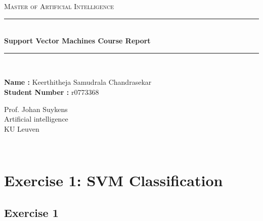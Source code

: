 \documentclass[12pt]{report}
\newcommand{\HRule}{\rule{\linewidth}{0.5mm}}
\begin{document}
	\begin{center}
		\textsc{\LARGE Master of Artificial Intelligence}\\[1.0cm]
		
		\HRule \\[0.4cm]
		{ \huge \bfseries Support Vector Machines Course Report}\\[0.15cm] 
		\HRule \\[1.5cm]
	\end{center}
	
	\begin{minipage}{0.5\textwidth}
		\begin{flushleft} \large
			{\bf Name :} Keerthitheja Samudrala Chandrasekar\\
			{\bf Student Number :} r0773368
		\end{flushleft}
	\end{minipage}
	\begin{minipage}{0.4\textwidth}
		\begin{flushright} \large
			Prof. Johan Suykens \\
			Artificial intelligence\\
			KU Leuven
			
		\end{flushright}
	\end{minipage}\\[2cm]
	\newpage
	\tableofcontents
	\newpage
	\chapter{Exercise 1: SVM Classification}
	\section{Exercise 1}
\end{document}
